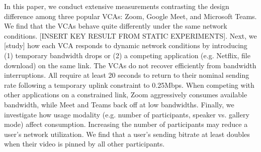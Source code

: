 {In this paper, we conduct extensive measurements contrasting the design difference among three popular VCAs: Zoom, Google Meet, and Microsoft Teams. We find that the VCAs behave quite differently under the same network conditions. [INSERT KEY RESULT FROM STATIC EXPERIMENTS]. Next, we [study] how each VCA responds to dynamic network conditions by introducing (1) temporary bandwidth drops or (2) a competing application (e.g. Netflix, file download) on the same link. The VCAs do not recover efficiently from bandwidth interruptions. All require at least 20 seconds to return to their nominal sending rate following a temporary uplink constraint to 0.25Mbps. When competing with other applications on a constrained link, Zoom aggressively consumes available bandwidth, while Meet and Teams back off at low bandwidths. Finally, we investigate how usage modality (e.g. number of participants, speaker vs. gallery mode) affect consumption. Increasing the number of participants may reduce a user's network utilization. 
We find that a user's sending bitrate at least doubles when their video is pinned by all other participants. 
}
